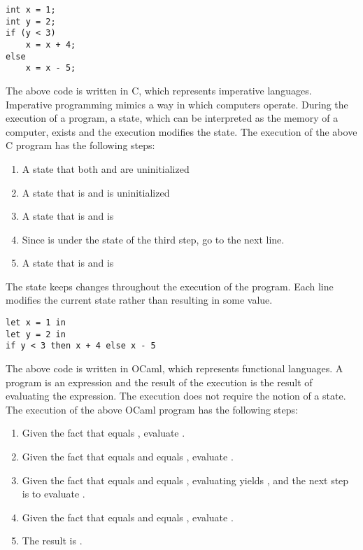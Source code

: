 \begin{verbatim}
int x = 1;
int y = 2;
if (y < 3)
    x = x + 4;
else
    x = x - 5;
\end{verbatim}

The above code is written in C, which represents imperative languages. Imperative
programming mimics a way in which computers operate. During the execution of a
program, a state, which can be interpreted as the memory of a computer,
exists and the execution modifies the state. The execution of the above C program has
the following steps:

\begin{enumerate}
\item A state that both  and  are uninitialized
\item A state that  is  and  is uninitialized
\item A state that  is  and  is 
\item Since  is  under the state of the third step, go to
the next line.
\item A state that  is  and  is 
\end{enumerate}

The state keeps changes throughout the execution of the program. Each line
modifies the current state rather than resulting in some value.

\begin{verbatim}
let x = 1 in
let y = 2 in
if y < 3 then x + 4 else x - 5
\end{verbatim}

The above code is written in OCaml, which represents functional languages. A
program is an expression and the result of the execution is the result of
evaluating the expression. The execution does not require the notion of a state.
The execution of the above OCaml program has the following steps:

\begin{enumerate}
\item Given the fact that  equals , evaluate
.
\item Given the fact that  equals  and  equals ,
evaluate .
\item Given the fact that  equals  and  equals ,
evaluating  yields , and the next step is to evaluate
.
\item Given the fact that  equals  and  equals ,
evaluate .
\item The result is .
\end{enumerate}

